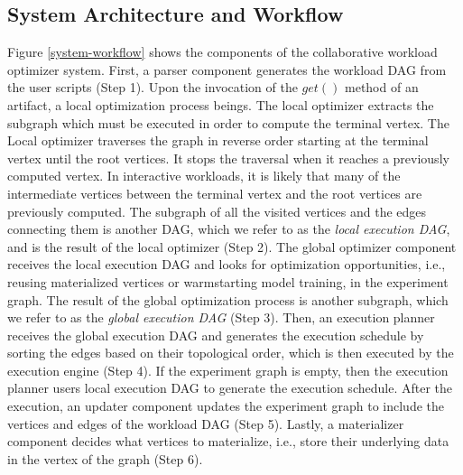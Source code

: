 \subsection{System Architecture and Workflow}
Figure \ref{system-workflow} shows the components of the collaborative workload optimizer system.
First, a parser component generates the workload DAG from the user scripts (Step 1).
Upon the invocation of the $get()$ method of an artifact, a local optimization process beings.
The local optimizer extracts the subgraph which must be executed in order to compute the terminal vertex.
The Local optimizer traverses the graph in reverse order starting at the terminal vertex until the root vertices.
It stops the traversal when it reaches a previously computed vertex.
In interactive workloads, it is likely that many of the intermediate vertices between the terminal vertex and the root vertices are previously computed.
The subgraph of all the visited vertices and the edges connecting them is another DAG, which we refer to as the \textit{local execution DAG}, and is the result of the local optimizer (Step 2).
The global optimizer component receives the local execution DAG and looks for optimization opportunities, i.e., reusing materialized vertices or warmstarting model training, in the experiment graph.
The result of the global optimization process is another subgraph, which we refer to as the \textit{global execution DAG} (Step 3).
Then, an execution planner receives the global execution DAG and generates the execution schedule by sorting the edges based on their topological order, which is then executed by the execution engine (Step 4).
If the experiment graph is empty, then the execution planner users local execution DAG to generate the execution schedule.
After the execution, an updater component updates the experiment graph to include the vertices and edges of the workload DAG (Step 5).
Lastly, a materializer component decides what vertices to materialize, i.e., store their underlying data in the vertex of the graph (Step 6).


